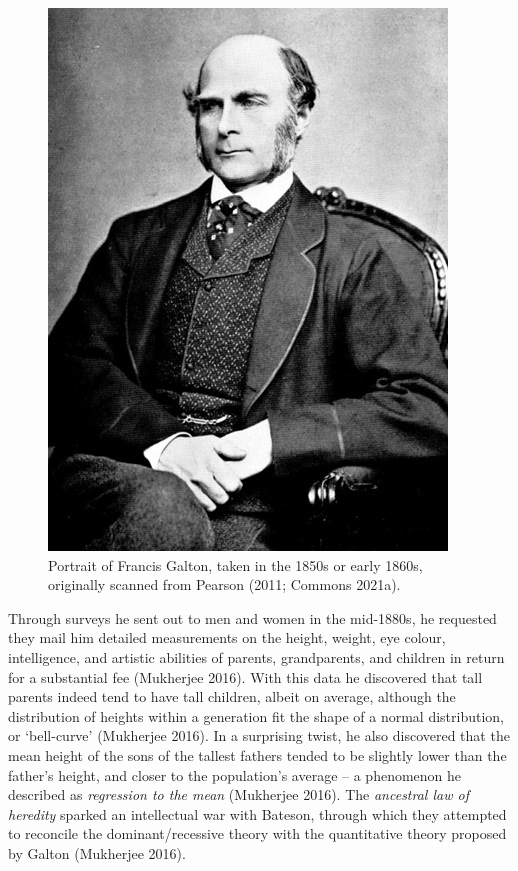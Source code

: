 \documentclass[
]{book}
\begin{document}
\begin{figure}

\includegraphics[width=1\linewidth]{figs/introduction/Francis_Galton_1850s} \hfill{}

\caption{Portrait of Francis Galton, taken in the 1850s or early 1860s, originally scanned from Pearson (2011; Commons 2021a).}\label{fig:galton}
\end{figure}

Through surveys he sent out to men and women in the mid-1880s, he requested they mail him detailed measurements on the height, weight, eye colour, intelligence, and artistic abilities of parents, grandparents, and children in return for a substantial fee (Mukherjee 2016). With this data he discovered that tall parents indeed tend to have tall children, albeit on average, although the distribution of heights within a generation fit the shape of a normal distribution, or `bell-curve' (Mukherjee 2016). In a surprising twist, he also discovered that the mean height of the sons of the tallest fathers tended to be slightly lower than the father's height, and closer to the population's average -- a phenomenon he described as \emph{regression to the mean} (Mukherjee 2016). The \emph{ancestral law of heredity} sparked an intellectual war with Bateson, through which they attempted to reconcile the dominant/recessive theory with the quantitative theory proposed by Galton (Mukherjee 2016).
\end{document}
